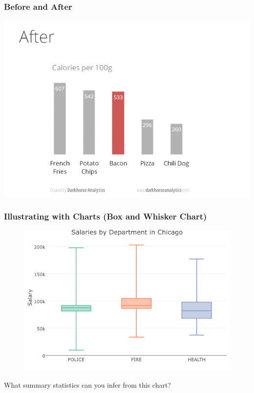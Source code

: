\documentclass{beamer}
\begin{document}
\begin{frame}
\frametitle{Before and After}
	\includegraphics[width = \textwidth]{./images/designAfter.png}
\end{frame}

\begin{frame}
\frametitle{Illustrating with Charts (Box and Whisker Chart)}
	\begin{figure}
		\includegraphics[scale = 0.5]{./images/chicagoBoxPlot.png}
	\end{figure}
	What summary statistics can you infer from this chart?
\end{frame}
\end{document}
